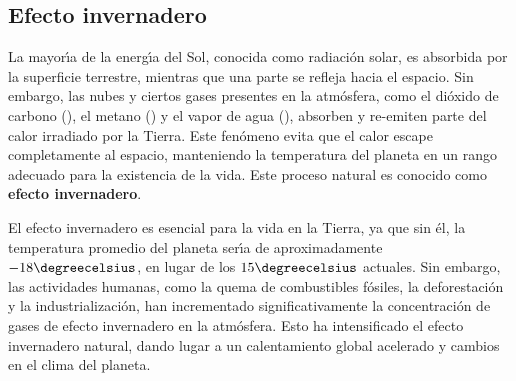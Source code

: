 \subsection{Efecto invernadero}\label{cinver}
La mayor\'{\i}a de la energ\'{\i}a del Sol, conocida como radiaci\'on solar, es absorbida por la superficie terrestre, mientras que una parte se refleja hacia el espacio. Sin embargo, las nubes y ciertos gases presentes en la atm\'osfera, como el di\'oxido de carbono (), el metano () y el vapor de agua (), absorben y re-emiten parte del calor irradiado por la Tierra. Este fen\'omeno evita que el calor escape completamente al espacio, manteniendo la temperatura del planeta en un rango adecuado para la existencia de la vida. Este proceso natural es conocido como \textbf{efecto invernadero}.

El efecto invernadero es esencial para la vida en la Tierra, ya que sin \'el, la temperatura promedio del planeta ser\'{\i}a de aproximadamente $-18\degreecelsius$, en lugar de los $15\degreecelsius$ actuales. Sin embargo, las actividades humanas, como la quema de combustibles f\'osiles, la deforestaci\'on y la industrializaci\'on, han incrementado significativamente la concentraci\'on de gases de efecto invernadero en la atm\'osfera. Esto ha intensificado el efecto invernadero natural, dando lugar a un calentamiento global acelerado y cambios en el clima del planeta. 

